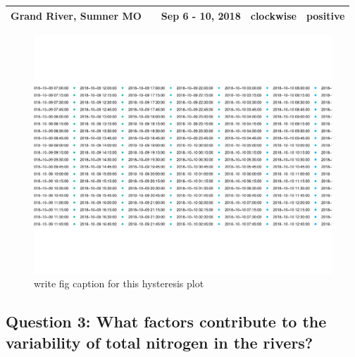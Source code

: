 \documentclass[12pt,]{article}
\begin{document}
\begin{longtable}[]{@{}lclll@{}}
\begin{minipage}[t]{0.15\columnwidth}
Grand River, Sumner MO\strut
\end{minipage} & \begin{minipage}[t]{0.22\columnwidth}\centering
06902000\strut
\end{minipage} & \begin{minipage}[t]{0.20\columnwidth}\raggedright
Sep 6 - 10, 2018\strut
\end{minipage} & \begin{minipage}[t]{0.17\columnwidth}\raggedright
clockwise\strut
\end{minipage} & \begin{minipage}[t]{0.12\columnwidth}\raggedright
positive\strut
\end{minipage}\tabularnewline
\bottomrule
\end{longtable}

\begin{figure}
\centering
\includegraphics{Missouri-Reasearch-Project---FINAL_files/figure-latex/unnamed-chunk-1-1.pdf}
\caption{write fig caption for this hysteresis plot}
\end{figure}

\hypertarget{question-3-what-factors-contribute-to-the-variability-of-total-nitrogen-in-the-rivers}{%
\subsection{Question 3: What factors contribute to the variability of
total nitrogen in the
rivers?}\label{question-3-what-factors-contribute-to-the-variability-of-total-nitrogen-in-the-rivers}}
\end{document}
